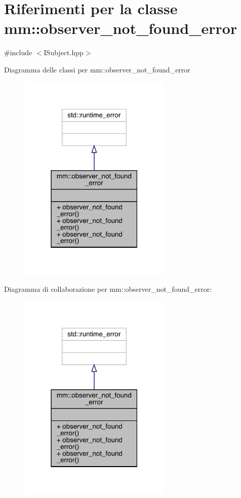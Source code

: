 \hypertarget{classmm_1_1observer__not__found__error}{}\section{Riferimenti per la classe mm\+:\+:observer\+\_\+not\+\_\+found\+\_\+error}
\label{classmm_1_1observer__not__found__error}


{\ttfamily \#include $<$I\+Subject.\+hpp$>$}



Diagramma delle classi per mm\+:\+:observer\+\_\+not\+\_\+found\+\_\+error
\nopagebreak
\begin{figure}[H]
\begin{center}
\leavevmode
\includegraphics[width=207pt]{da/d02/classmm_1_1observer__not__found__error__inherit__graph}
\end{center}
\end{figure}


Diagramma di collaborazione per mm\+:\+:observer\+\_\+not\+\_\+found\+\_\+error\+:
\nopagebreak
\begin{figure}[H]
\begin{center}
\leavevmode
\includegraphics[width=207pt]{d7/d18/classmm_1_1observer__not__found__error__coll__graph}
\end{center}
\end{figure}
